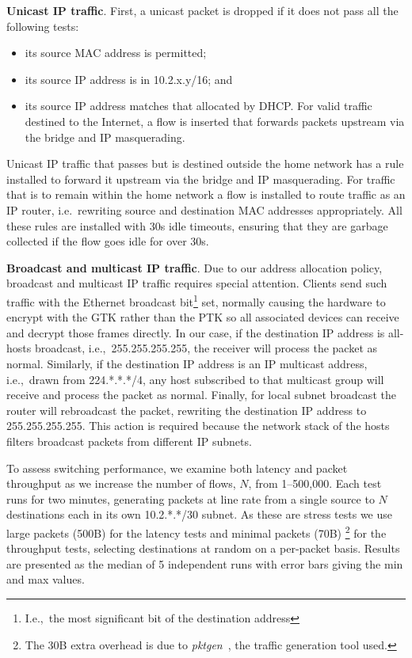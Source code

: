 \textbf{Unicast IP traffic}.  First, a unicast packet is dropped if it does not
pass all the following tests: 
\begin{itemize}
    \item its source MAC address is permitted; 
    \item its source IP address is in 10.2.x.y/16; and
    \item its source IP address matches that allocated by DHCP.  For valid
      traffic destined to the Internet, a flow is inserted that forwards packets
      upstream via the bridge and IP masquerading.  
\end{itemize} 
Unicast IP traffic that passes but is destined outside the home network has a
rule installed to forward it upstream via the bridge and IP masquerading.  For
traffic that is to remain within the home network a flow is installed to route
traffic as an IP router, i.e.~rewriting source and destination MAC addresses
appropriately.  All these rules are installed with 30s idle timeouts, ensuring
that they are garbage collected if the flow goes idle for over 30s.

\textbf{Broadcast and multicast IP traffic}.  Due to our address allocation
policy, broadcast and multicast IP traffic requires special attention.  Clients
send such traffic with the Ethernet broadcast bit\footnote{I.e.,~the most
  significant bit of the destination address} set, normally causing the hardware
to encrypt with the GTK rather than the PTK so all associated devices can
receive and decrypt those frames directly.  In our case, if the destination IP
address is all-hosts broadcast, i.e.,~255.255.255.255, the receiver will process
the packet as normal.  Similarly, if the destination IP address is an IP
multicast address, i.e.,~drawn from 224.*.*.*/4, any host subscribed to that
multicast group will receive and process the packet as normal. Finally, for
local subnet broadcast the router will rebroadcast the packet, rewriting the
destination IP address to 255.255.255.255. This action is required because the
network stack of the hosts filters broadcast packets from different IP subnets.

To assess switching performance, we examine both latency and packet throughput
as we increase the number of flows, $N$, from 1--500,000.  Each test runs for
two minutes, generating packets at line rate from a single source to $N$
destinations each in its own 10.2.*.*/30 subnet.  As these are stress tests we
use large packets (500B) for the latency tests and minimal packets (70B)
\footnote{The 30B extra overhead is due to
  \emph{pktgen}~\cite{olsson05:_linux_packet_gener}, the traffic generation tool
  used.} for the throughput tests, selecting destinations at random on a
per-packet basis.  Results are presented as the median of 5 independent runs
with error bars giving the min and max values. 

